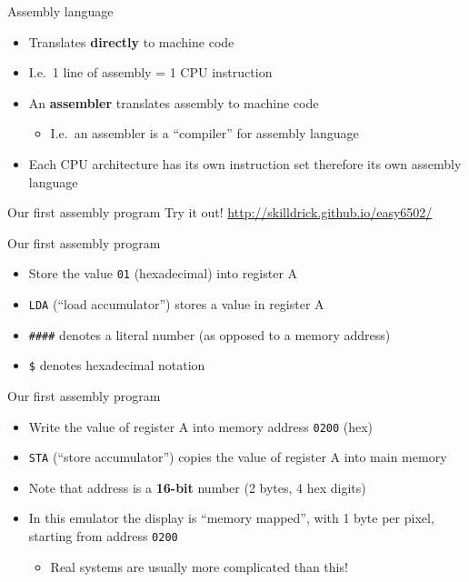 \begin{frame}{Assembly language}
	\begin{itemize}
		\pause\item Translates \textbf{directly} to machine code
		\pause\item I.e.\ 1 line of assembly = 1 CPU instruction
		\pause\item An \textbf{assembler} translates assembly to machine code
			\begin{itemize}
				\pause\item I.e.\ an assembler is a ``compiler'' for assembly language
			\end{itemize}
		\pause\item Each CPU architecture has its own instruction set therefore
			its own assembly language
	\end{itemize}
\end{frame}

\begin{frame}{Our first assembly program}
	\pause
	\pause Try it out! \url{http://skilldrick.github.io/easy6502/}
\end{frame}

\begin{frame}{Our first assembly program}
	\pause 
	\begin{itemize}
		\pause\item Store the value \texttt{01} (hexadecimal) into register A
		\pause\item \lstinline{LDA} (``load accumulator'') stores a value in register A
		\pause\item \lstinline{####} denotes a literal number (as opposed to a memory address)
		\pause\item \lstinline{$} denotes hexadecimal notation
		\phantom{\lstinline{$}} %
	\end{itemize}
\end{frame}

\begin{frame}{Our first assembly program}
	\pause 
	\begin{itemize}
		\pause\item Write the value of register A into memory address \texttt{0200} (hex)
		\pause\item \lstinline{STA} (``store accumulator'') copies the value of register A into main memory
		\pause\item Note that address is a \textbf{16-bit} number (2 bytes, 4 hex digits)
		\pause\item In this emulator the display is ``memory mapped'', with 1 byte per pixel, starting from address \texttt{0200}
			\begin{itemize}
				\item Real systems are usually more complicated than this!
			\end{itemize}
	\end{itemize}
\end{frame}

